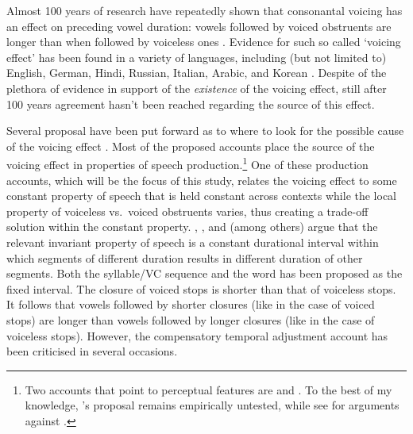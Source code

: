 \documentclass[preprint]{JASAnew}
\begin{document}
Almost 100 years of research have repeatedly shown that consonantal
voicing has an effect on preceding vowel duration: vowels followed by
voiced obstruents are longer than when followed by voiceless ones
\citep{heffner1937, house1953, belasco1953, peterson1960, halle1967, chen1970, klatt1973, lisker1974, raphael1975, javkin1976, maddieson1976, farnetani1986, kluender1988, laeufer1992, fowler1992, hussein1994, esposito2002, lampp2004, warren2005, durvasula2012}.
Evidence for such so called `voicing effect' has been found in a variety
of languages, including (but not limited to) English, German, Hindi,
Russian, Italian, Arabic, and Korean \citep[see][ for a more
comprehensive, but still not exhaustive list]{maddieson1976}. Despite of
the plethora of evidence in support of the \emph{existence} of the
voicing effect, still after 100 years agreement hasn't been reached
regarding the source of this effect.

Several proposal have been put forward as to where to look for the
possible cause of the voicing effect \citep[see][ and \citet{begus2017}
for an overview]{soskuthy2013}. Most of the proposed accounts place the
source of the voicing effect in properties of speech
production.\footnote{Two accounts that point to perceptual features are \citet{javkin1976} and \citet{kluender1988}. To the best of my knowledge, \citet{javkin1976}'s proposal remains empirically untested, while see \citet{fowler1992} for arguments against \citet{kluender1988}.}
One of these production accounts, which will be the focus of this study,
relates the voicing effect to some constant property of speech that is
held constant across contexts while the local property of voiceless
vs.~voiced obstruents varies, thus creating a trade-off solution within
the constant property. \citet{lindblom1967}, \citet{slis1969}, and
\citet{lehiste1970} (among others) argue that the relevant invariant
property of speech is a constant durational interval within which
segments of different duration results in different duration of other
segments. Both the syllable/VC sequence \citep{lindblom1967} and the
word \citep{slis1969a, slis1969, lehiste1970, lehiste1970a} has been
proposed as the fixed interval. The closure of voiced stops is shorter
than that of voiceless stops. It follows that vowels followed by shorter
closures (like in the case of voiced stops) are longer than vowels
followed by longer closures (like in the case of voiceless stops).
However, the compensatory temporal adjustment account has been
criticised in several occasions.
\end{document}
